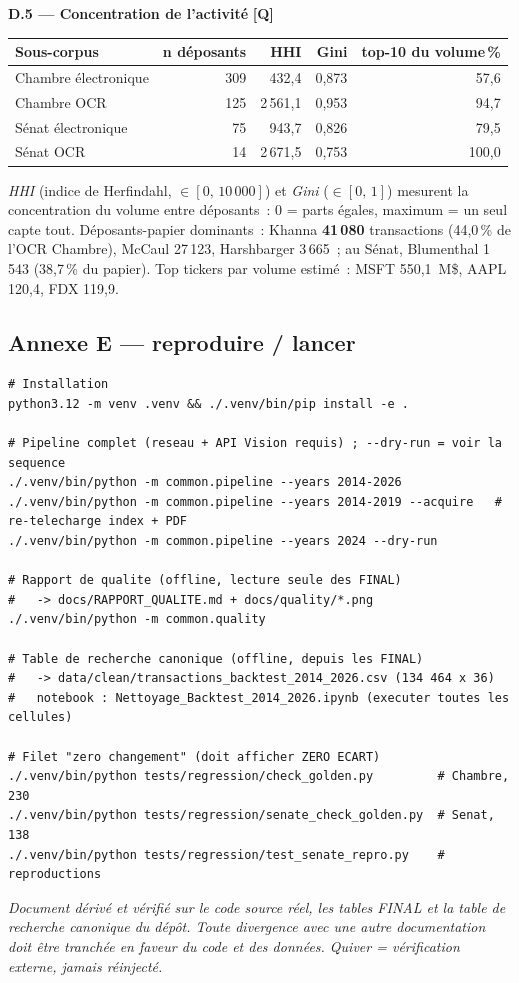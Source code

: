 \documentclass[11pt,a4paper]{article}
\begin{document}
\textbf{D.5 — Concentration de l'activité} \hfill {\footnotesize\textbf{[Q]}}
\begin{center}\small
\begin{tabular}{l r rr r}
\toprule
\bfseries Sous-corpus & \bfseries n déposants & \bfseries HHI & \bfseries Gini & \bfseries top-10 du volume\,\%\\
\midrule
{\color{houseC}Chambre électronique} & 309 & 432,4 & 0,873 & 57,6 \\
{\color{houseC}Chambre OCR} & 125 & 2\,561,1 & 0,953 & 94,7 \\
{\color{senateC}Sénat électronique} & 75 & 943,7 & 0,826 & 79,5 \\
{\color{senateC}Sénat OCR} & 14 & 2\,671,5 & 0,753 & 100,0 \\
\bottomrule
\end{tabular}
\end{center}
{\footnotesize \emph{HHI} (indice de Herfindahl, $\in [0,\,10\,000]$) et \emph{Gini} ($\in [0,\,1]$) mesurent
la concentration du volume entre déposants~: 0 = parts égales, maximum = un seul capte tout.
Déposants-papier dominants~: Khanna \textbf{41\,080} transactions (44,0\,\% de l'OCR Chambre), McCaul
27\,123, Harshbarger 3\,665~; au Sénat, Blumenthal 1\,543 (38,7\,\% du papier). Top tickers par volume
estimé~: MSFT 550,1~M\$, AAPL 120,4, FDX 119,9.}

\subsection{Annexe E — reproduire / lancer}
\label{anx:run}
{\footnotesize
\begin{verbatim}
# Installation
python3.12 -m venv .venv && ./.venv/bin/pip install -e .

# Pipeline complet (reseau + API Vision requis) ; --dry-run = voir la sequence
./.venv/bin/python -m common.pipeline --years 2014-2026
./.venv/bin/python -m common.pipeline --years 2014-2019 --acquire   # re-telecharge index + PDF
./.venv/bin/python -m common.pipeline --years 2024 --dry-run

# Rapport de qualite (offline, lecture seule des FINAL)
#   -> docs/RAPPORT_QUALITE.md + docs/quality/*.png
./.venv/bin/python -m common.quality

# Table de recherche canonique (offline, depuis les FINAL)
#   -> data/clean/transactions_backtest_2014_2026.csv (134 464 x 36)
#   notebook : Nettoyage_Backtest_2014_2026.ipynb (executer toutes les cellules)

# Filet "zero changement" (doit afficher ZERO ECART)
./.venv/bin/python tests/regression/check_golden.py         # Chambre, 230
./.venv/bin/python tests/regression/senate_check_golden.py  # Senat,   138
./.venv/bin/python tests/regression/test_senate_repro.py    # reproductions
\end{verbatim}}

\vfill
\begin{center}\footnotesize\itshape
Document dérivé et vérifié sur le code source réel, les tables FINAL et la table de recherche canonique du
dépôt. Toute divergence avec une autre documentation doit être tranchée en faveur du code et des données.
Quiver = vérification externe, jamais réinjecté.
\end{center}
\end{document}
